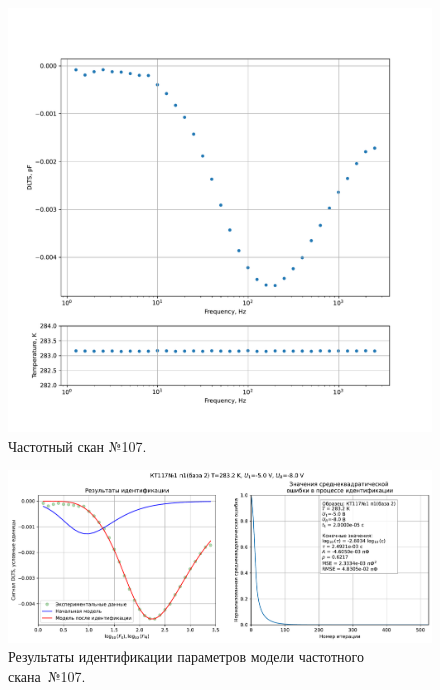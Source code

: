 \begin{figure}[!ht]
    \centering
    \includegraphics[width=1\textwidth]{../plots/КТ117№1_п1(база 2)_2500Гц-1Гц_1пФ_+10С_-5В-8В_100мВ_20мкс_шаг_0,1.pdf}
    \caption{Частотный скан №107.}
    \label{pic:frequency_scan_107}
\end{figure}

\begin{figure}[!ht]
    \centering
    \includegraphics[width=1\textwidth]{../plots/КТ117№1_п1(база 2)_2500Гц-1Гц_1пФ_+10С_-5В-8В_100мВ_20мкс_шаг_0,1_model.pdf}
    \caption{Результаты идентификации параметров модели частотного скана~№107.}
    \label{pic:frequency_scan_model107}
\end{figure}

\pagebreak


